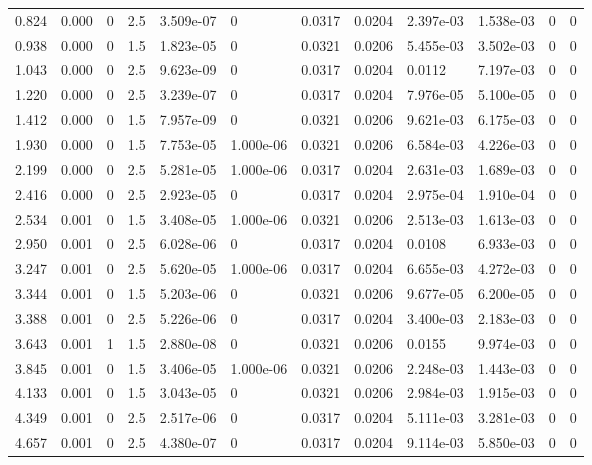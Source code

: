 \documentclass[preview]{standalone}
\begin{document}
{{\begin{tabular}{L{1.2cm}C{1.2cm} C{0.3cm}C{0.5cm} C{1.4cm}C{1.4cm} C{1.4cm}C{1.4cm} C{1.6cm}C{1.6cm} C{1.6cm}C{1.6cm}}
  0.824  &  0.000  & 0     & 2.5 &  3.509e-07  & 0  &  0.0317&   0.0204& 2.397e-03 & 1.538e-03   &  0 & 0  \\ 
  0.938  &  0.000  & 0     & 1.5 &  1.823e-05  & 0  &  0.0321&   0.0206& 5.455e-03 & 3.502e-03   &  0 & 0  \\ 
  1.043  &  0.000  & 0     & 2.5 &  9.623e-09  & 0  &  0.0317&   0.0204& 0.0112 & 7.197e-03   &  0 & 0  \\ 
  1.220  &  0.000  & 0     & 2.5 &  3.239e-07  & 0  &  0.0317&   0.0204& 7.976e-05 & 5.100e-05   &  0 & 0  \\ 
  1.412  &  0.000  & 0     & 1.5 &  7.957e-09  & 0  &  0.0321&   0.0206& 9.621e-03 & 6.175e-03   &  0 & 0  \\ 
  1.930  &  0.000  & 0     & 1.5 &  7.753e-05  & 1.000e-06  &  0.0321&   0.0206& 6.584e-03 & 4.226e-03   &  0 & 0  \\ 
  2.199  &  0.000  & 0     & 2.5 &  5.281e-05  & 1.000e-06  &  0.0317&   0.0204& 2.631e-03 & 1.689e-03   &  0 & 0  \\ 
  2.416  &  0.000  & 0     & 2.5 &  2.923e-05  & 0  &  0.0317&   0.0204& 2.975e-04 & 1.910e-04   &  0 & 0  \\ 
  2.534  &  0.001  & 0     & 1.5 &  3.408e-05  & 1.000e-06  &  0.0321&   0.0206& 2.513e-03 & 1.613e-03   &  0 & 0  \\ 
  2.950  &  0.001  & 0     & 2.5 &  6.028e-06  & 0  &  0.0317&   0.0204& 0.0108 & 6.933e-03   &  0 & 0  \\ 
  3.247  &  0.001  & 0     & 2.5 &  5.620e-05  & 1.000e-06  &  0.0317&   0.0204& 6.655e-03 & 4.272e-03   &  0 & 0  \\ 
  3.344  &  0.001  & 0     & 1.5 &  5.203e-06  & 0  &  0.0321&   0.0206& 9.677e-05 & 6.200e-05   &  0 & 0  \\ 
  3.388  &  0.001  & 0     & 2.5 &  5.226e-06  & 0  &  0.0317&   0.0204& 3.400e-03 & 2.183e-03   &  0 & 0  \\ 
  3.643  &  0.001  & 1     & 1.5 &  2.880e-08  & 0  &  0.0321&   0.0206& 0.0155 & 9.974e-03   &  0 & 0  \\ 
  3.845  &  0.001  & 0     & 1.5 &  3.406e-05  & 1.000e-06  &  0.0321&   0.0206& 2.248e-03 & 1.443e-03   &  0 & 0  \\ 
  4.133  &  0.001  & 0     & 1.5 &  3.043e-05  & 0  &  0.0321&   0.0206& 2.984e-03 & 1.915e-03   &  0 & 0  \\ 
  4.349  &  0.001  & 0     & 2.5 &  2.517e-06  & 0  &  0.0317&   0.0204& 5.111e-03 & 3.281e-03   &  0 & 0  \\ 
  4.657  &  0.001  & 0     & 2.5 &  4.380e-07  & 0  &  0.0317&   0.0204& 9.114e-03 & 5.850e-03   &  0 & 0  \\ 

\end{tabular}}}
\end{document}
